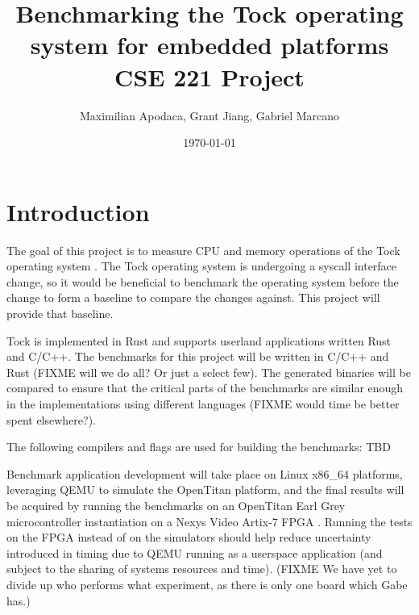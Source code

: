 \documentclass{article}
\title{Benchmarking the Tock operating system for embedded platforms \\[0.2em]\smaller{} CSE 221 Project}
\author{Maximilian Apodaca, Grant Jiang, Gabriel Marcano}
\date{\today}
\begin{document}
\maketitle

\section{Introduction}

The goal of this project is to measure CPU and memory operations of the Tock operating system \cite{levy17multiprogramming}. The Tock operating system is undergoing a syscall interface change, so it would be beneficial to benchmark the operating system before the change to form a baseline to compare the changes against. This project will provide that baseline. %

Tock is implemented in Rust and supports userland applications written Rust and C/C++. The benchmarks for this project will be written in C/C++ and Rust (FIXME will we do all? Or just a select few). The generated binaries will be compared to ensure that the critical parts of the benchmarks are similar enough in the implementations using different languages (FIXME would time be better spent elsewhere?). %

The following compilers and flags are used for building the benchmarks: TBD

Benchmark application development will take place on Linux x86\_64 platforms, leveraging QEMU to simulate the OpenTitan platform, and the final results will be acquired by running the benchmarks on an OpenTitan Earl Grey microcontroller instantiation on a Nexys Video Artix-7 FPGA \cite{opentitangithub}. Running the tests on the FPGA instead of on the simulators should help reduce uncertainty introduced in timing due to QEMU running as a userspace application (and subject to the sharing of systems resources and time). %
(FIXME We have yet to divide up who performs what experiment, as there is only one board which Gabe has.)
\end{document}
